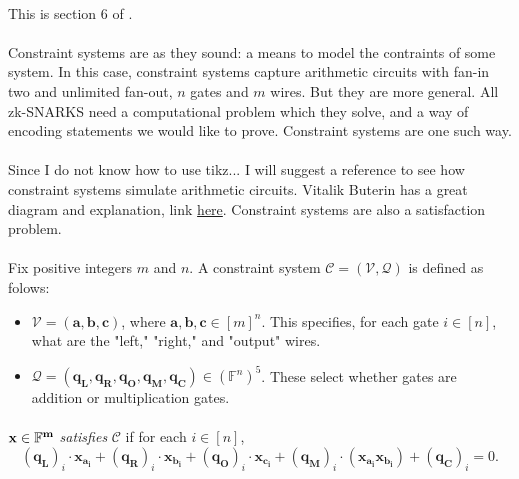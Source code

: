 \documentclass[11pt]{article}
\newcommand{\field}{\mathbb{F}}
\begin{document}
\paragraph{} This is section 6 of \cite{plonk}.

\paragraph{} Constraint systems are as they sound: a means to model the contraints of some system. In this case, constraint systems capture arithmetic circuits with fan-in two and unlimited fan-out, $n$ gates and $m$ wires. But they are more general. All zk-SNARKS need a computational problem which they solve, and a way of encoding statements we would like to prove. Constraint systems are one such way.

\paragraph{} Since I do not know how to use tikz... I will suggest a reference to see how constraint systems simulate arithmetic circuits. Vitalik Buterin has a great diagram and explanation, link \href{https://vitalik.ca/general/2019/09/22/plonk.html}{here}. Constraint systems are also a satisfaction problem.

\paragraph{} Fix positive integers $m$ and $n$. A constraint system $\mathscr{C} = (\mathcal{V}, \mathcal{Q})$ is defined as folows:

\begin{itemize}
    \item $\mathcal{V} = (\mathbf{a}, \mathbf{b}, \mathbf{c})$, where $\mathbf{a}, \mathbf{b}, \mathbf{c} \in [m]^n$. This specifies, for each gate $i \in [n]$, what are the "left," "right," and "output" wires.
    \item $\mathcal{Q} = (\mathbf{q_L}, \mathbf{q_R}, \mathbf{q_O}, \mathbf{q_M}, \mathbf{q_C}) \in (\field^n)^5$. These select whether gates are addition or multiplication gates.
\end{itemize}

\paragraph{} $\bf x \in \field^m$ \textit{satisfies} $\mathscr{C}$ if for each $i \in [n]$,
\[ (\mathbf{q_L})_i \cdot \mathbf{x_{a_i}} + (\mathbf{q_R})_i \cdot \mathbf{x_{b_i}} + (\mathbf{q_O})_i \cdot \mathbf{x_{c_i}} + (\mathbf{q_M})_i \cdot (\mathbf{x_{a_i}} \mathbf{x_{b_i}}) + (\mathbf{q_C})_i = 0. \]
\end{document}
